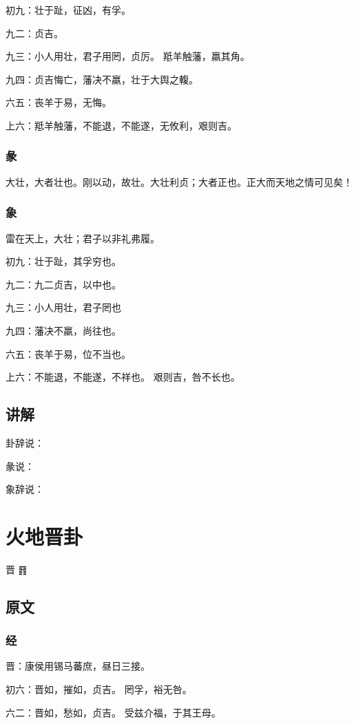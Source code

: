 \documentclass[12pt,oneside]{book}
\begin{document}
初九：壮于趾，征凶，有孚。

九二：贞吉。

九三：小人用壮，君子用罔，贞厉。 羝羊触藩，羸其角。

九四：贞吉悔亡，藩决不羸，壮于大舆之輹。

六五：丧羊于易，无悔。

上六：羝羊触藩，不能退，不能遂，无攸利，艰则吉。

\subsection{彖}
大壮，大者壮也。刚以动，故壮。大壮利贞；大者正也。正大而天地之情可见矣！

\subsection{象}
雷在天上，大壮；君子以非礼弗履。

初九：壮于趾，其孚穷也。

九二：九二贞吉，以中也。

九三：小人用壮，君子罔也

九四：藩决不羸，尚往也。

六五：丧羊于易，位不当也。

上六：不能退，不能遂，不祥也。 艰则吉，咎不长也。

\section{讲解}
卦辞说：

彖说：

象辞说：

\chapter{火地晋卦}
晋 {\Large ䷢}

\section{原文}

\subsection{经}
晋：康侯用锡马蕃庶，昼日三接。

初六：晋如，摧如，贞吉。 罔孚，裕无咎。

六二：晋如，愁如，贞吉。 受兹介福，于其王母。
\end{document}
